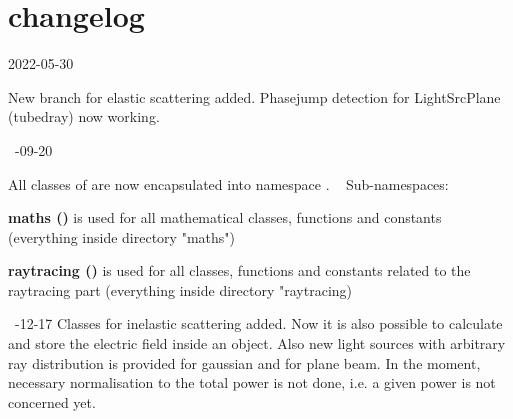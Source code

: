 \chapter{changelog }
\hypertarget{md_changelog}{}\label{md_changelog}
2022-\/05-\/30 

New branch for elastic scattering added. Phasejump detection for Light\+Src\+Plane (tubedray) now working. 

~-\/09-\/20 

All classes of  are now encapsulated into namespace . ~\newline
 Sub-\/namespaces\+: ~\newline
 
\begin{DoxyItemize}
\item {\bfseries{maths ()}} is used for all mathematical classes, functions and constants (everything inside directory "{}maths"{})  
\item {\bfseries{raytracing ()}} is used for all classes, functions and constants related to the raytracing part (everything inside directory "{}raytracing)  
\end{DoxyItemize}

~-\/12-\/17 Classes for inelastic scattering added. Now it is also possible to calculate and store the electric field inside an object. Also new light sources with arbitrary ray distribution is provided for gaussian and for plane beam. In the moment, necessary normalisation to the total power is not done, i.\+e. a given power is not concerned yet. 